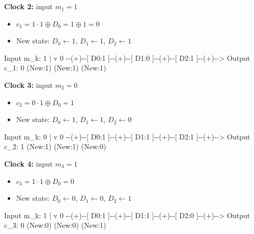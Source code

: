 \documentclass[11pt,oneside]{book}
\newenvironment{Shaded}{}{}
\newcommand{\NormalTok}[1]{#1}
\providecommand{\tightlist}{\setlength{\itemsep}{0pt}\setlength{\parskip}{0pt}}
\theoremstyle{plain}
\theoremstyle{definition}
\theoremstyle{remark}
\begin{document}
\textbf{Clock 2:} input \(m_1=1\)

\begin{itemize}
\tightlist
\item
  \(c_1 = 1 \cdot 1 \oplus D_0 = 1 \oplus 1 = 0\)
\item
  New state: \(D_0 \leftarrow 1\), \(D_1 \leftarrow 1\),
  \(D_2 \leftarrow 1\)
\end{itemize}

\begin{Shaded}
\begin{Highlighting}[]
\NormalTok{Input m\_k: 1}
\NormalTok{     |}
\NormalTok{     v}
\NormalTok{0 {-}{-}(+){-}{-}[ D0:1 ]{-}{-}(+){-}{-}[ D1:0 ]{-}{-}(+){-}{-}[ D2:1 ]{-}{-}(+){-}{-}\textgreater{} Output c\_1: 0}
\NormalTok{         (New:1)        (New:1)        (New:1)}
\end{Highlighting}
\end{Shaded}

\textbf{Clock 3:} input \(m_2=0\)

\begin{itemize}
\tightlist
\item
  \(c_2 = 0 \cdot 1 \oplus D_0 = 1\)
\item
  New state: \(D_0 \leftarrow 1\), \(D_1 \leftarrow 1\),
  \(D_2 \leftarrow 0\)
\end{itemize}

\begin{Shaded}
\begin{Highlighting}[]
\NormalTok{Input m\_k: 0}
\NormalTok{     |}
\NormalTok{     v}
\NormalTok{0 {-}{-}(+){-}{-}[ D0:1 ]{-}{-}(+){-}{-}[ D1:1 ]{-}{-}(+){-}{-}[ D2:1 ]{-}{-}(+){-}{-}\textgreater{} Output c\_2: 1}
\NormalTok{         (New:1)        (New:1)        (New:0)}
\end{Highlighting}
\end{Shaded}

\textbf{Clock 4:} input \(m_3=1\)

\begin{itemize}
\tightlist
\item
  \(c_3 = 1 \cdot 1 \oplus D_0 = 0\)
\item
  New state: \(D_0 \leftarrow 0\), \(D_1 \leftarrow 0\),
  \(D_2 \leftarrow 1\)
\end{itemize}

\begin{Shaded}
\begin{Highlighting}[]
\NormalTok{Input m\_k: 1}
\NormalTok{     |}
\NormalTok{     v}
\NormalTok{0 {-}{-}(+){-}{-}[ D0:1 ]{-}{-}(+){-}{-}[ D1:1 ]{-}{-}(+){-}{-}[ D2:0 ]{-}{-}(+){-}{-}\textgreater{} Output c\_3: 0}
\NormalTok{         (New:0)        (New:0)        (New:1)}
\end{Highlighting}
\end{Shaded}
\end{document}
